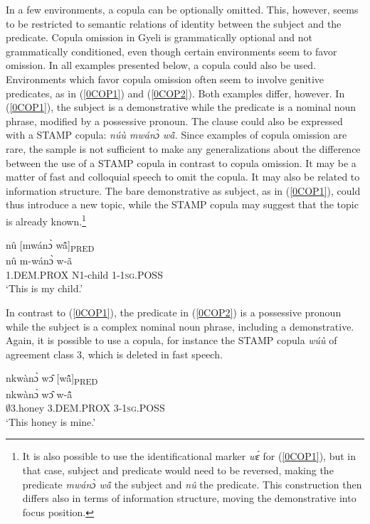 In a few environments, a copula can be optionally omitted. This, however, seems to be restricted to semantic relations of identity between the subject and the predicate. Copula omission in Gyeli is grammatically optional and not grammatically conditioned, even though certain environments seem to favor omission. In all examples presented below, a copula could also be used. Environments which favor copula omission often seem to involve genitive predicates, as in (\ref{0COP1}) and (\ref{0COP2}). Both examples differ, however. In (\ref{0COP1}), the subject is a demonstrative while the predicate is a nominal noun phrase, modified by a possessive pronoun.
The clause could also be expressed with a STAMP copula: {\itshape núù mwánɔ̀ wã̂.} Since examples of copula omission are rare, the sample is not sufficient to make any generalizations about the difference between the use of a STAMP copula in contrast to copula omission. It may be a matter of fast and colloquial speech to omit the copula. It may also be related to information structure. The bare demonstrative as subject, as in (\ref{0COP1}), could thus introduce a new topic, while the STAMP copula may suggest that the topic is already known.\footnote{It is also possible to use the identificational marker {\itshape wɛ́} for (\ref{0COP1}), but in that case, subject and predicate would need to be reversed, making the predicate {\itshape mwánɔ̀ wã̂} the subject and {\itshape nû} the predicate. This construction then differs also in terms of information structure, moving the demonstrative into focus position.}

\begin{exe}
\ex\label{0COP1}
  \glll     nû [mwánɔ̀ wã̂]\textsubscript{PRED}  \\
             nû m-wánɔ̀ w-ã \\
               1.DEM.PROX N1-child 1-1\textsc{sg}.POSS  \\
    \trans `This is my child.'
\end{exe}

In contrast to (\ref{0COP1}), the predicate in (\ref{0COP2}) is a possessive pronoun while the subject is a complex nominal noun phrase, including a demonstrative. Again, it is possible to use a copula, for instance the STAMP copula {\itshape wúù} of agreement class 3, which is deleted in fast speech. 

\begin{exe}
\ex\label{0COP2}
  \glll nkwànɔ̀ wɔ̂ [wã̂]\textsubscript{PRED}   \\
        nkwànɔ̀ wɔ̂ w-ã̂   \\
          $\emptyset$3.honey 3.DEM.PROX 3-1\textsc{sg}.POSS  \\
    \trans `This honey is mine.'
\end{exe}

